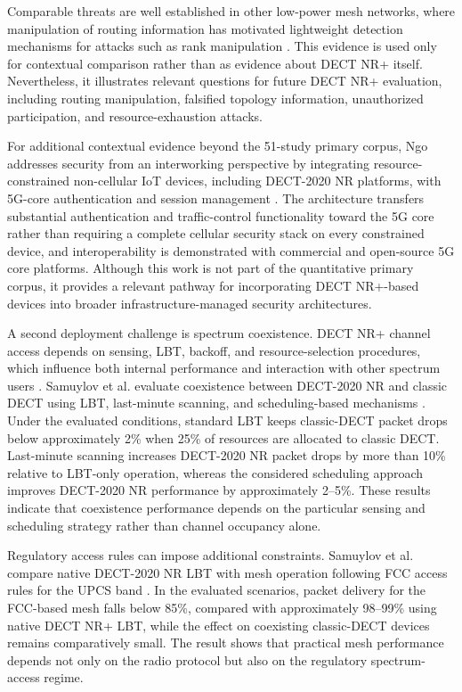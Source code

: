 Comparable threats are well established in other low-power mesh networks, where manipulation of routing information has motivated lightweight detection mechanisms for attacks such as rank manipulation \cite{kalyaniResourceefficientEnsembleMachine2026}. This evidence is used only for contextual comparison rather than as evidence about DECT NR+ itself. Nevertheless, it illustrates relevant questions for future DECT NR+ evaluation, including routing manipulation, falsified topology information, unauthorized participation, and resource-exhaustion attacks.

For additional contextual evidence beyond the 51-study primary corpus, Ngo addresses security from an interworking perspective by integrating resource-constrained non-cellular IoT devices, including DECT-2020 NR platforms, with 5G-core authentication and session management \cite{ngoIoTDeviceAuthentication2025}. The architecture transfers substantial authentication and traffic-control functionality toward the 5G core rather than requiring a complete cellular security stack on every constrained device, and interoperability is demonstrated with commercial and open-source 5G core platforms. Although this work is not part of the quantitative primary corpus, it provides a relevant pathway for incorporating DECT NR+-based devices into broader infrastructure-managed security architectures.

A second deployment challenge is spectrum coexistence. DECT NR+ channel access depends on sensing, LBT, backoff, and resource-selection procedures, which influence both internal performance and interaction with other spectrum users \cite{etsi_ts103636_2,etsi_ts103636_4}. Samuylov et al. evaluate coexistence between DECT-2020 NR and classic DECT using LBT, last-minute scanning, and scheduling-based mechanisms \cite{samuylovPerformanceAssessmentDECT20202023}. Under the evaluated conditions, standard LBT keeps classic-DECT packet drops below approximately 2\% when 25\% of resources are allocated to classic DECT. Last-minute scanning increases DECT-2020 NR packet drops by more than 10\% relative to LBT-only operation, whereas the considered scheduling approach improves DECT-2020 NR performance by approximately 2--5\%. These results indicate that coexistence performance depends on the particular sensing and scheduling strategy rather than channel occupancy alone.

Regulatory access rules can impose additional constraints. Samuylov et al. compare native DECT-2020 NR LBT with mesh operation following FCC access rules for the UPCS band \cite{samuylovPerformanceDECT2020NR2025}. In the evaluated scenarios, packet delivery for the FCC-based mesh falls below 85\%, compared with approximately 98--99\% using native DECT NR+ LBT, while the effect on coexisting classic-DECT devices remains comparatively small. The result shows that practical mesh performance depends not only on the radio protocol but also on the regulatory spectrum-access regime.


